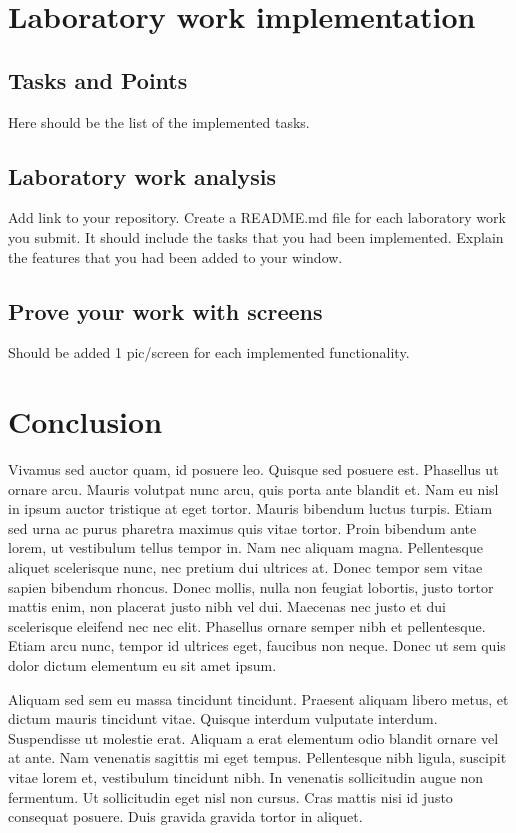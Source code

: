 \documentclass[12pt,a4paper,titlepage]{article}
\begin{document}
\section{Laboratory work implementation}

\subsection{Tasks and Points}

Here should be the list of the implemented tasks.

\subsection{Laboratory work analysis}

Add link to your repository.
Create a README.md file for each laboratory work you submit. It should include the tasks that you had been implemented.
Explain the features that you had been added to your window.

\subsection{Prove your work with screens}

Should be added 1 pic/screen for each implemented functionality.

\clearpage
\cleardoublepage

{}
\section*{Conclusion}

Vivamus sed auctor quam, id posuere leo. Quisque sed posuere est. Phasellus ut ornare arcu. Mauris volutpat nunc arcu, quis porta ante blandit et. Nam eu nisl in ipsum auctor tristique at eget tortor. Mauris bibendum luctus turpis. Etiam sed urna ac purus pharetra maximus quis vitae tortor. Proin bibendum ante lorem, ut vestibulum tellus tempor in. Nam nec aliquam magna. Pellentesque aliquet scelerisque nunc, nec pretium dui ultrices at. Donec tempor sem vitae sapien bibendum rhoncus. Donec mollis, nulla non feugiat lobortis, justo tortor mattis enim, non placerat justo nibh vel dui. Maecenas nec justo et dui scelerisque eleifend nec nec elit. Phasellus ornare semper nibh et pellentesque. Etiam arcu nunc, tempor id ultrices eget, faucibus non neque. Donec ut sem quis dolor dictum elementum eu sit amet ipsum.

Aliquam sed sem eu massa tincidunt tincidunt. Praesent aliquam libero metus, et dictum mauris tincidunt vitae. Quisque interdum vulputate interdum. Suspendisse ut molestie erat. Aliquam a erat elementum odio blandit ornare vel at ante. Nam venenatis sagittis mi eget tempus. Pellentesque nibh ligula, suscipit vitae lorem et, vestibulum tincidunt nibh. In venenatis sollicitudin augue non fermentum. Ut sollicitudin eget nisl non cursus. Cras mattis nisi id justo consequat posuere. Duis gravida gravida tortor in aliquet.

\clearpage
\cleardoublepage

\cleardoublepage
% 
\cleardoublepage
   
\end{document}
